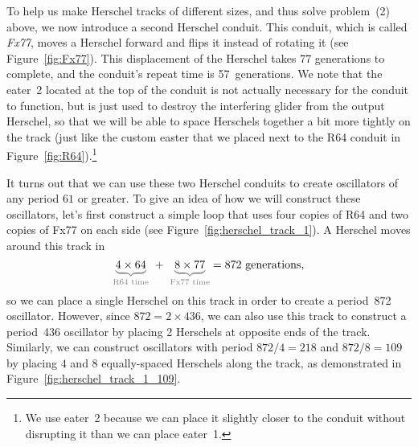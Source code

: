 To help us make Herschel tracks of different sizes, and thus solve problem~(2) above, we now introduce a second Herschel conduit. This conduit, which is called \emph{Fx77}, moves a Herschel forward and flips it instead of rotating it (see Figure~\ref{fig:Fx77}). This displacement of the Herschel takes 77 generations to complete, and the conduit's repeat time is 57~generations. We note that the eater~2 located at the top of the conduit is not actually necessary for the conduit to function, but is just used to destroy the interfering glider from the output Herschel, so that we will be able to space Herschels together a bit more tightly on the track (just like the custom easter that we placed next to the R64 conduit in Figure~\ref{fig:R64}).\footnote{We use eater~2 because we can place it slightly closer to the conduit without disrupting it than we can place eater~1.}

It turns out that we can use these two Herschel conduits to create oscillators of any period $61$ or greater. To give an idea of how we will construct these oscillators, let's first construct a simple loop that uses four copies of R64 and two copies of Fx77 on each side (see Figure~\ref{fig:herschel_track_1}). A Herschel moves around this track in
\[
{\color{gray}\underbrace{\color{black}4 \times 64}_\text{R64 time}} \ + \ {\color{gray}\underbrace{\color{black}8\times 77}_\text{Fx77 time}} = 872 \text{ generations,}
\]
so we can place a single Herschel on this track in order to create a period~872 oscillator. However, since $872 = 2 \times 436$, we can also use this track to construct a period~436 oscillator by placing 2 Herschels at opposite ends of the track. Similarly, we can construct oscillators with period $872/4 = 218$ and $872/8 = 109$ by placing $4$ and $8$ equally-spaced Herschels along the track, as demonstrated in Figure~\ref{fig:herschel_track_1_109}.

